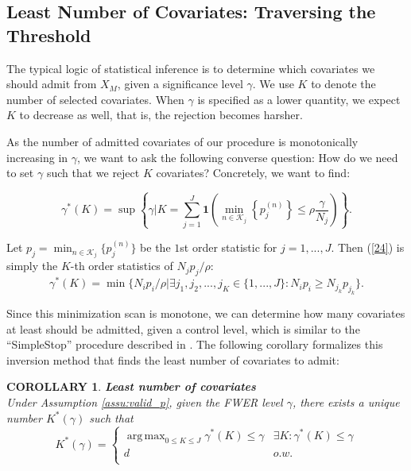 \documentclass[11pt]{article}
\newcommand{\oo}{\bm{1}}
\DeclareMathOperator*{\argmax}{arg\,max}
\newtheorem{corollary}{COROLLARY}
\begin{document}
	
	
	\subsection{Least Number of Covariates: Traversing the Threshold}
	
	
	The typical logic of statistical inference is to determine which covariates we should admit from $X_M$, given a significance level $\gamma$. We use $K$ to denote the number of selected covariates. When $\gamma$ is specified as a lower quantity, we expect $K$ to decrease as well, that is,  the rejection becomes harsher.
	
	As the number of admitted covariates of our procedure is monotonically increasing in $\gamma$, we want to ask the following converse question: How do we need to set $\gamma$ such that we reject $K$ covariates? Concretely, we want to find:
	
	\begin{equation}\label{24}
		\gamma^*(K)=\sup \left\{\gamma | K=\sum_{j=1}^{J} \oo \left(\min_{n\in \mathcal{K}_j} \left \{p_j^{(n)} \right \}\leq \rho \frac{\gamma}{N_j} \right) \right\} .
	\end{equation}
	
	
	Let $p_j=\min_{n\in \mathcal{K}_j}\{p_j^{(n)}\}$ be the $1$st order statistic for $j=1,...,J$. Then (\ref{24}) is simply the $K$-th order statistics of $N_j p_j / \rho$:
	\begin{equation}
		\gamma^*(K)=\min\{N_ip_i/\rho |
		\exists j_1,j_2,...,j_K\in \{1,...,J \}: N_ip_i\geq N_{j_k}p_{j_k}
		\}.
	\end{equation}
	
	Since this minimization scan is monotone, we can determine how many covariates at least should be admitted, given a control level, which is similar to the ``SimpleStop'' procedure described in \cite{16-AOS1536}. The following corollary formalizes this inversion method that finds the least number of covariates to admit:
	
	\begin{corollary}{\bf Least number of covariates}\label{col3}\\
		Under Assumption \ref{assu:valid_p}, given the FWER level $\gamma$, there exists a unique number $K^*(\gamma)$ such that
		\begin{equation}
			K^*(\gamma)=
			\begin{cases}
				\argmax_{0\leq K\leq J}\gamma^*(K)\leq\gamma & \exists K:\gamma^*(K)\leq\gamma\\
				d & o.w.\\
			\end{cases}
		\end{equation}
	\end{corollary}
	
\end{document}
